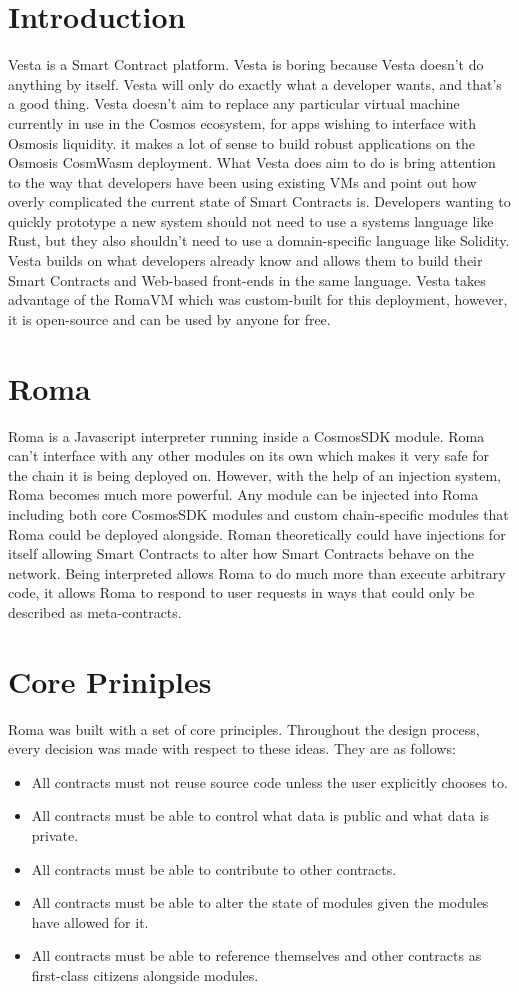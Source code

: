 \documentclass[a4paper]{article}
\begin{document}
\section{Introduction}
Vesta is a Smart Contract platform. Vesta is boring because Vesta doesn't do anything by itself. Vesta will only do exactly what a developer wants, and that's a good thing. Vesta doesn't aim to replace any particular virtual machine currently in use in the Cosmos ecosystem, for apps wishing to interface with Osmosis liquidity. it makes a lot of sense to build robust applications on the Osmosis CosmWasm deployment. What Vesta does aim to do is bring attention to the way that developers have been using existing VMs and point out how overly complicated the current state of Smart Contracts is. Developers wanting to quickly prototype a new system should not need to use a systems language like Rust, but they also shouldn't need to use a domain-specific language like Solidity. Vesta builds on what developers already know and allows them to build their Smart Contracts and Web-based front-ends in the same language. Vesta takes advantage of the RomaVM which was custom-built for this deployment, however, it is open-source and can be used by anyone for free.

\section{Roma}
Roma is a Javascript interpreter running inside a CosmosSDK module. Roma can't interface with any other modules on its own which makes it very safe for the chain it is being deployed on. However, with the help of an injection system, Roma becomes much more powerful. Any module can be injected into Roma including both core CosmosSDK modules and custom chain-specific modules that Roma could be deployed alongside. Roman theoretically could have injections for itself allowing Smart Contracts to alter how Smart Contracts behave on the network. Being interpreted allows Roma to do much more than execute arbitrary code, it allows Roma to respond to user requests in ways that could only be described as meta-contracts.

\section{Core Priniples}
Roma was built with a set of core principles. Throughout the design process, every decision was made with respect to these ideas. They are as follows:
\begin{itemize}
  \item All contracts must not reuse source code unless the user explicitly chooses to.
  \item All contracts must be able to control what data is public and what data is private.
  \item All contracts must be able to contribute to other contracts.
  \item All contracts must be able to alter the state of modules given the modules have allowed for it.
  \item All contracts must be able to reference themselves and other contracts as first-class citizens alongside modules.
\end{itemize}
\end{document}
